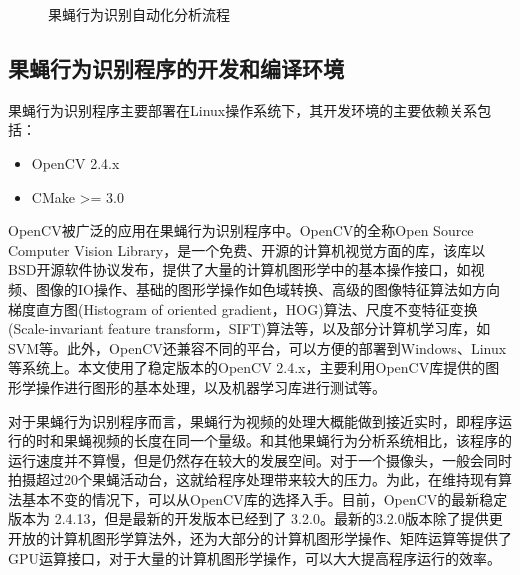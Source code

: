 \begin{figure}
\centering
{}
\caption{果蝇行为识别自动化分析流程}
\label{fig:fly_detection_procedure2}
\end{figure}

\subsection{果蝇行为识别程序的开发和编译环境}

果蝇行为识别程序主要部署在Linux操作系统下，其开发环境的主要依赖关系包括：
\begin{itemize}
\item OpenCV 2.4.x
\item CMake >= 3.0
\end{itemize}

OpenCV被广泛的应用在果蝇行为识别程序中\cite{itseez2015opencv,itseez2014theopencv}。OpenCV的全称Open Source Computer Vision Library，是一个免费、开源的计算机视觉方面的库，该库以BSD开源软件协议发布，提供了大量的计算机图形学中的基本操作接口，如视频、图像的IO操作、基础的图形学操作如色域转换、高级的图像特征算法如方向梯度直方图(Histogram of oriented gradient，HOG)算法\cite{dalal2005histograms}、尺度不变特征变换(Scale-invariant feature transform，SIFT)算法\cite{lowe1999object}等，以及部分计算机学习库，如SVM等。此外，OpenCV还兼容不同的平台，可以方便的部署到Windows、Linux等系统上。本文使用了稳定版本的OpenCV 2.4.x，主要利用OpenCV库提供的图形学操作进行图形的基本处理，以及机器学习库进行测试等。

对于果蝇行为识别程序而言，果蝇行为视频的处理大概能做到接近实时，即程序运行的时和果蝇视频的长度在同一个量级。和其他果蝇行为分析系统相比，该程序的运行速度并不算慢\cite{dankert2009automated}，但是仍然存在较大的发展空间。对于一个摄像头，一般会同时拍摄超过20个果蝇活动台，这就给程序处理带来较大的压力。为此，在维持现有算法基本不变的情况下，可以从OpenCV库的选择入手。目前，OpenCV的最新稳定版本为 2.4.13，但是最新的开发版本已经到了 3.2.0。最新的3.2.0版本除了提供更开放的计算机图形学算法外，还为大部分的计算机图形学操作、矩阵运算等提供了GPU运算接口，对于大量的计算机图形学操作，可以大大提高程序运行的效率。

